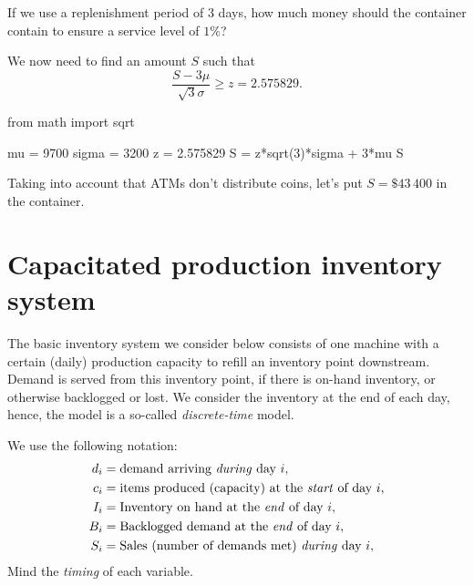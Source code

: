 \begin{exercise}[Continuation]
  If we use a replenishment period of 3 days, how much money should the container contain to ensure a service level of $1\%$?
  \begin{solution}
We now need to find an amount $S$ such that
\begin{equation*}
\frac{S-3\mu}{\sqrt{3} \sigma} \geq z = 2.575829.
\end{equation*}
\begin{pyconsole}
from math import sqrt

mu = 9700
sigma = 3200
z = 2.575829
S = z*sqrt(3)*sigma + 3*mu
S
\end{pyconsole}

Taking into account that ATMs don't distribute coins, let's put $S=\$43\,400$ in the container.
  \end{solution}
\end{exercise}

\begin{comment}

We shall cover here the following policies

Possible exercises:
\begin{itemize}
\item an exercise on why $(T,Q)$ is silly
\end{itemize}
  
\end{comment}

\section{Capacitated production inventory system}
\label{sec:capac-prod-invent}



The basic inventory system we consider below consists of one machine with a certain (daily) production capacity to refill an inventory point downstream. Demand is served from this inventory point, if there is on-hand inventory, or otherwise backlogged or lost. We consider the inventory at the end of each day, hence, the model is a so-called \emph{discrete-time} model.

We use the following notation:
\begin{align*}
  d_i &= \text{demand arriving \emph{during} day $i$}, \\
  c_i &= \text{items produced (capacity) at the \emph{start} of day $i$}, \\
  I_i &= \text{Inventory on hand at the \emph{end} of day $i$}, \\
  B_i &= \text{Backlogged demand at the \emph{end} of day $i$}, \\
  S_i &= \text{Sales (number of demands met) \emph{during}  day $i$}, \\
\end{align*}
Mind the \emph{timing} of each variable.

